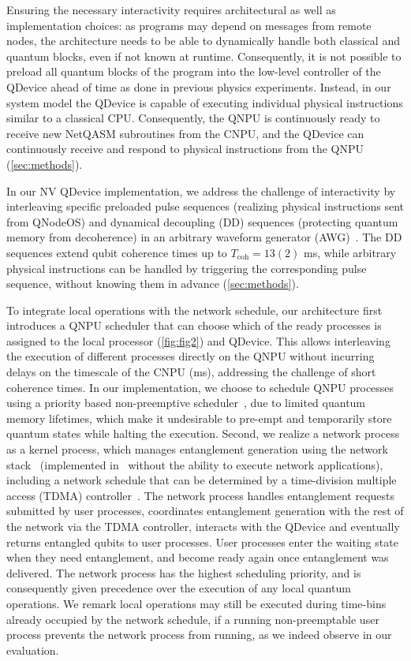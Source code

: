 Ensuring the necessary interactivity requires architectural as well as implementation choices: as programs may depend on messages from remote nodes, the architecture needs to be able to dynamically handle both classical and quantum blocks, even if not known at runtime. Consequently, it is not possible to preload all quantum blocks of the program into the low-level controller of the QDevice ahead of time as done in previous physics experiments. Instead, in our system model the QDevice is capable of executing individual physical instructions similar to a classical CPU. Consequently, the QNPU is continuously ready to receive new NetQASM subroutines from the CNPU, and the QDevice can continuously receive and respond to physical instructions from the QNPU (\cref{sec:methods}).

In our NV QDevice implementation, we address the challenge of interactivity by interleaving specific preloaded pulse sequences (realizing physical instructions sent from QNodeOS) and dynamical decoupling (DD) sequences (protecting quantum memory from decoherence) in an arbitrary waveform generator (AWG)~\cite{zurich_instruments_hdawg_2019}. The DD sequences extend qubit coherence times up to $T_{\text{coh}} = 13(2)$ ms, while arbitrary physical instructions can be handled by triggering the corresponding pulse sequence, without knowing them in advance (\cref{sec:methods}).

To integrate local operations with the network schedule, our architecture first introduces a QNPU scheduler that can choose which of the ready processes is assigned to the local processor (\cref{fig:fig2}) and QDevice. This allows interleaving the execution of different processes directly on the QNPU without incurring delays on the timescale of the CNPU (ms), addressing the challenge of short coherence times. In our implementation, we choose to schedule QNPU processes using a priority based non-preemptive scheduler~\cite{liu_1973_scheduling}, due to limited quantum memory lifetimes, which make it undesirable to pre-empt and temporarily store quantum states while halting the execution. Second, we realize a network process as a kernel process, which manages entanglement generation using the network stack~\cite{dahlberg_2019_egp,kozlowski_2020_qnp} (implemented in~\cite{pompili_2022_experimental} without the ability to execute network applications), including a network schedule that can be determined by a time-division multiple access (TDMA) controller~\cite{skrzypczyk_2021_arch}. The network process handles entanglement requests submitted by user processes, coordinates entanglement generation with the rest of the network via the TDMA controller, interacts with the QDevice and eventually returns entangled qubits to user processes. User processes enter the waiting state when they need entanglement, and become ready again once entanglement was delivered. The network process has the highest scheduling priority, and is consequently given precedence over the execution of any local quantum operations. We remark local operations may still be executed during time-bins already occupied by the network schedule, if a running non-preemptable user process prevents the network process from running, as we indeed observe in our evaluation.

